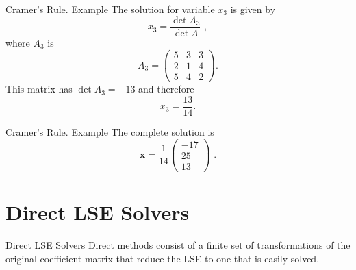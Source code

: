 \documentclass[11pt]{beamer}
\begin{document}
\begin{frame}[fragile]{Cramer's Rule. Example}
The solution for variable $x_3$ is given by 
\begin{equation}
x_3 = \frac{\det A_3}{\det A}\,\,,
\end{equation}
where $A_3$ is
\begin{equation}
A_3 = \begin{pmatrix}
5&3&3\\
2&1&4\\
5&4&2
\end{pmatrix}.
\end{equation}
This matrix has $\det A_3 = -13$ and therefore
\begin{equation}
x_3 = \frac{13}{14}.
\end{equation}
\end{frame}

\begin{frame}[fragile]{Cramer's Rule. Example}
The complete solution is
\begin{equation}
\textbf{x}
= \frac{1}{14} \begin{pmatrix} -17 \\ 25 \\ 13 \end{pmatrix}\,\,.
\end{equation}
\end{frame}

\section{Direct LSE Solvers}
\begin{frame}[fragile]{Direct LSE Solvers}
Direct methods consist of a finite set of transformations
of the original coefficient matrix that reduce the LSE to one that is
easily solved.
\end{frame}
\end{document}
